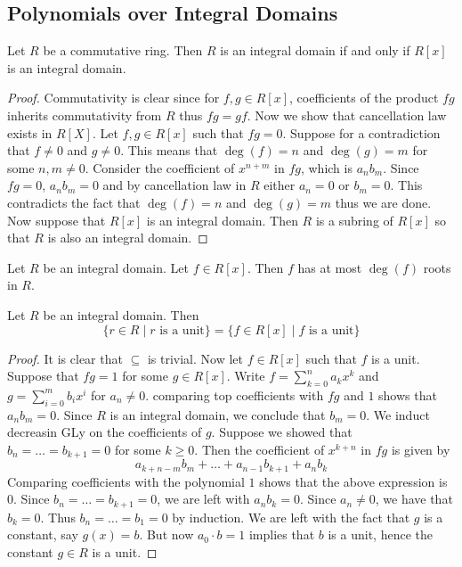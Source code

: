 \documentclass[a4paper]{article}
\begin{document}
\subsection{Polynomials over Integral Domains}
\begin{prp}{}{} Let $R$ be a commutative ring. Then $R$ is an integral domain if and only if $R[x]$ is an integral domain. 
\begin{proof}
Commutativity is clear since for $f,g\in R[x]$, coefficients of the product $fg$ inherits commutativity from $R$ thus $fg=gf$. Now we show that cancellation law exists in $R[X]$. Let $f,g\in R[x]$ such that $fg=0$. Suppose for a contradiction that $f\neq 0$ and $g\neq 0$. This means that $\deg(f)=n$ and $\deg(g)=m$ for some $n,m\neq 0$. Consider the coefficient of $x^{n+m}$ in $fg$, which is $a_nb_m$. Since $fg=0$, $a_nb_m=0$ and by cancellation law in $R$ either $a_n=0$ or $b_m=0$. This contradicts the fact that $\deg(f)=n$ and $\deg(g)=m$ thus we are done. \\

Now suppose that $R[x]$ is an integral domain. Then $R$ is a subring of $R[x]$ so that $R$ is also an integral domain. 
\end{proof}
\end{prp}

\begin{prp}{}{} Let $R$ be an integral domain. Let $f\in R[x]$. Then $f$ has at most $\deg(f)$ roots in $R$. 
\end{prp}

\begin{prp}{}{} Let $R$ be an integral domain. Then $$\{r\in R\;|\;r\text{ is a unit}\}=\{f\in R[x]\;|\;f\text{ is a unit}\}$$ 
\begin{proof}
It is clear that $\subseteq$ is trivial. Now let $f\in R[x]$ such that $f$ is a unit. Suppose that $fg=1$ for some $g\in R[x]$. Write $f=\sum_{k=0}^na_kx^k$ and $g=\sum_{i=0}^mb_ix^i$ for $a_n\neq 0$. comparing top coefficients with $fg$ and $1$ shows that $a_nb_m=0$. Since $R$ is an integral domain, we conclude that $b_m=0$. We induct decreasin GLy on the coefficients of $g$. Suppose we showed that $b_n=\dots=b_{k+1}=0$ for some $k\geq 0$. Then the coefficient of $x^{k+n}$ in $fg$ is given by $$a_{k+n-m}b_m+\dots+a_{n-1}b_{k+1}+a_nb_k$$ Comparing coefficients with the polynomial $1$ shows that the above expression is $0$. Since $b_n=\dots=b_{k+1}=0$, we are left with $a_nb_k=0$. Since $a_n\neq 0$, we have that $b_k=0$. Thus $b_n=\dots=b_1=0$ by induction. We are left with the fact that $g$ is a constant, say $g(x)=b$. But now $a_0\cdot b=1$ implies that $b$ is a unit, hence the constant $g\in R$ is a unit. 
\end{proof}
\end{prp}
\end{document}
